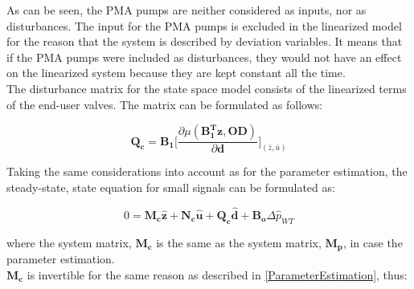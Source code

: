 %
%
%
As can be seen, the PMA pumps are neither considered as inputs, nor as disturbances. The input for the PMA pumps is excluded in the linearized model for the reason that the system is described by deviation variables. It means that if the PMA pumps were included as disturbances, they would not have an effect on the linearized system because they are kept constant all the time. 
\\
The disturbance matrix for the state space model consists of the linearized terms of the end-user valves. The matrix can be formulated as follows: 

\begin{equation}
  \pmb{Q_c} = \pmb{B_1} \bigg[ \frac{\partial{\mu(\pmb{{B_1^{T}}}\pmb{z}, \pmb{OD})}}{{\partial{\pmb{d}}}}  \bigg]_{(\bar{z}, \bar{u})}  
\label{disturbance_matrix}
\end{equation}

Taking the same considerations into account as for the parameter estimation, the steady-state, state equation for small signals can be formulated as: 

 \begin{equation}
 0 = \pmb{M_c} \pmb{\hat{z}} + \pmb{N_c} \pmb{\hat{u}} + \pmb{Q_c} \pmb{\hat{d}} + \pmb{B_o} \Delta \hat{p}_{WT}    
 \label{statespace_control_sys}
\end{equation}

where the system matrix, $\pmb{M_c}$ is the same as the system matrix, $\pmb{M_p}$, in case the parameter estimation. 
\\
$\pmb{M_c}$ is invertible for the same reason as described in \eqref{ParameterEstimation}, thus:

